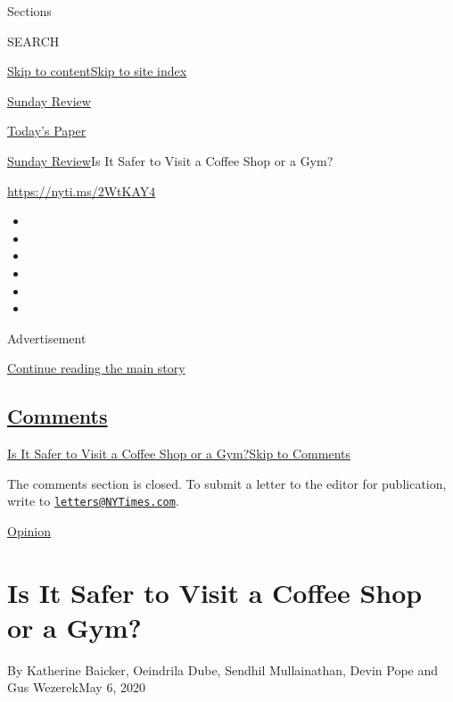 Sections

SEARCH

\protect\hyperlink{site-content}{Skip to
content}\protect\hyperlink{site-index}{Skip to site index}

\href{https://www.nytimes3xbfgragh.onion/section/opinion/sunday}{Sunday
Review}

\href{https://myaccount.nytimes3xbfgragh.onion/auth/login?response_type=cookie\&client_id=vi}{}

\href{https://www.nytimes3xbfgragh.onion/section/todayspaper}{Today's
Paper}

\href{/section/opinion/sunday}{Sunday Review}\textbar{}Is It Safer to
Visit a Coffee Shop or a Gym?

\url{https://nyti.ms/2WtKAY4}

\begin{itemize}
\item
\item
\item
\item
\item
\item
\end{itemize}

Advertisement

\protect\hyperlink{after-top}{Continue reading the main story}

\hypertarget{comments}{%
\subsection{\texorpdfstring{\protect\hyperlink{commentsContainer}{Comments}}{Comments}}\label{comments}}

\href{}{Is It Safer to Visit a Coffee Shop or a Gym?}\href{}{Skip to
Comments}

The comments section is closed. To submit a letter to the editor for
publication, write to
\href{mailto:letters@NYTimes.com}{\nolinkurl{letters@NYTimes.com}}.

\href{/section/opinion}{Opinion}

\hypertarget{is-it-safer-to-visit-a-coffee-shop-or-a-gym}{%
\section{Is It Safer to Visit a Coffee Shop or a
Gym?}\label{is-it-safer-to-visit-a-coffee-shop-or-a-gym}}

By Katherine Baicker, Oeindrila Dube, Sendhil Mullainathan, Devin Pope
and Gus WezerekMay 6, 2020


